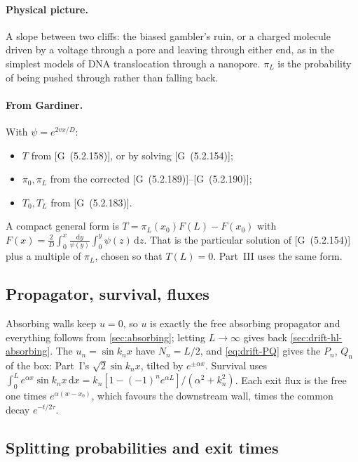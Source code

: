 \documentclass[11pt]{article}
\numberwithin{equation}{section}
\newcommand{\dd}{\mathrm{d}}
\newcommand{\G}[1]{[G~(#1)]}
\begin{document}
\paragraph{Physical picture.} A slope between two cliffs: the biased gambler's ruin, or a charged molecule
driven by a voltage through a pore and leaving through either end, as in the simplest models of DNA translocation
through a nanopore. $\pi_L$ is the probability of being pushed through rather than falling back.

\paragraph{From Gardiner.} With $\psi=e^{2vx/D}$:
\begin{itemize}
  \item $T$ from \G{5.2.158}, or by solving \G{5.2.154};
  \item $\pi_0,\pi_L$ from the corrected \G{5.2.189}--\G{5.2.190};
  \item $T_0,T_L$ from \G{5.2.183}.
\end{itemize}
A compact general form is $T=\pi_L(x_0)F(L)-F(x_0)$ with
$F(x)=\frac2D\int_0^x\frac{\dd y}{\psi(y)}\int_0^y\psi(z)\,\dd z$. That is the particular solution of
\G{5.2.154} plus a multiple of $\pi_L$, chosen so that $T(L)=0$. Part~III uses the same form.

\subsection{Propagator, survival, fluxes}

Absorbing walls keep $u=0$, so $u$ is exactly the free absorbing propagator and everything follows from
\cref{sec:absorbing}; letting $L\to\infty$ gives back \cref{sec:drift-hl-absorbing}. The $u_n=\sin k_nx$ have
$N_n=L/2$, and \cref{eq:drift-PQ} gives the $P_n$, $Q_n$ of the box: Part~I's $\sqrt2\sin k_nx$, tilted by
$e^{\pm\alpha x}$. Survival uses
$\int_0^Le^{\alpha x}\sin k_nx\,\dd x=k_n[1-(-1)^ne^{\alpha L}]/(\alpha^2+k_n^2)$. Each exit flux is the free one
times $e^{\alpha(w-x_0)}$, which favours the downstream wall, times the common decay $e^{-t/2\tau}$.

\subsection{Splitting probabilities and exit times}
\end{document}
